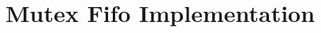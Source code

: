 \documentclass{article}
\begin{document}
\section{Mutex Fifo Implementation}\label{appendix:fifoments}
%
%
%
%
\end{document}
